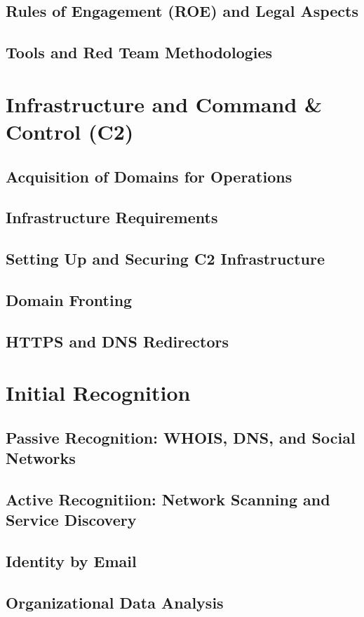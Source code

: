 \documentclass{article}
\begin{document}
\subsection{Rules of Engagement (ROE) and Legal Aspects}
\subsection{Tools and Red Team Methodologies}
\section{Infrastructure and Command \& Control (C2)}
\subsection{Acquisition of Domains for Operations}
\subsection{Infrastructure Requirements}
\subsection{Setting Up and Securing C2 Infrastructure}
\subsection{Domain Fronting}
\subsection{HTTPS and DNS Redirectors}
\section{Initial Recognition}
\subsection{Passive Recognition: WHOIS, DNS, and Social Networks}
\subsection{Active Recognitiion: Network Scanning and Service Discovery}
\subsection{Identity by Email}
\subsection{Organizational Data Analysis}
\end{document}
